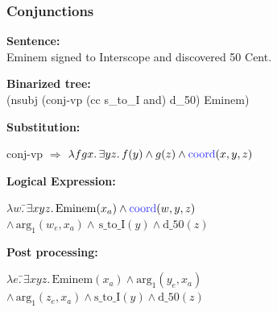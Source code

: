 \documentclass[mathserif,12pt]{beamer}
\newcommand{\hlight}[1]{{\color{blue!80} #1}}
\renewcommand{\land}{\wedge}
\newcommand{\lspace}{.\,}
\begin{document}
\begin{frame}[noframenumbering]
\frametitle{Conjunctions}

\textbf{Sentence:} \\
{\centering Eminem signed to Interscope and discovered 50 Cent. \\} 

\vspace{0.3cm}  
\textbf{Binarized tree:} \\
{\centering (nsubj (conj-vp (cc s\_to\_I and) d\_50) Eminem) \\}

\pause
\vspace{0.3cm}  
\textbf{Substitution:} 

\begin{tabbing}
  conj-vp $\Rightarrow$ $\lambda f g x \lspace \exists y z \lspace f(y) \land g(z) \land \mathrm{\hlight{coord}}(x, y, z)$
\end{tabbing}

\vspace{0.3cm}  
\textbf{Logical Expression:}
\begin{tabbing}
  $\lambda w \lspace$\=$\exists x y z \lspace \mathrm{Eminem}(x_a) \land \mathrm{\hlight{coord}}(w, y, z)$ \\
\> $\land\, \mathrm{arg_1}(w_e, x_a) \land\, \mathrm{s\_to\_I}(y) \land \mathrm{d\_50}(z)$
\end{tabbing}

\pause
\textbf{Post processing:}
\begin{tabbing}
$\lambda e \lspace$\=$\exists x y z \lspace \mathrm{Eminem}(x_a) \land \mathrm{arg_1}(y_e, x_a)$ \\
\> $\land\,\mathrm{arg_1}(z_e, x_a) \land \mathrm{s\_to\_I}(y) \land \mathrm{d\_50}(z)$
\end{tabbing}
\end{frame}
\end{document}

